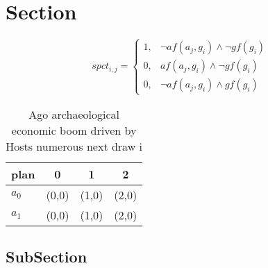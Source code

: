 \documentclass[a4paper]{article}
\begin{document}
\section{Section}

\begin{equation}
spct_{i,j} =
\begin{cases}
1, & \text{$\neg af(a_j,g_i) \wedge \neg gf(g_i)$}\\
0, & \text{$af(a_j,g_i) \wedge \neg gf(g_i)$}\\
0, & \text{$\neg af(a_j,g_i) \wedge gf(g_i)$}
\end{cases}
\end{equation}

\begin{table}
\begin{adjustbox}{width=0.6\columnwidth}
\begin{tabular}{|l|l|l|l|}
\hline
\textbf{plan} & \multicolumn{1}{c|}{\textbf{0}} & \multicolumn{1}{c|}{\textbf{1}} & \multicolumn{1}{c|}{\textbf{2}} \\ \hline
\textbf{$a_0$}  & (0,0) & (1,0) & (2,0) \\ \hline
\textbf{$a_1$}  & (0,0) & (1,0) & (2,0) \\ \hline
\end{tabular}
\end{adjustbox}
\caption{Ago archaeological economic boom driven by Hosts numerous next draw i
}
\end{table}

\subsection{SubSection}
\end{document}
